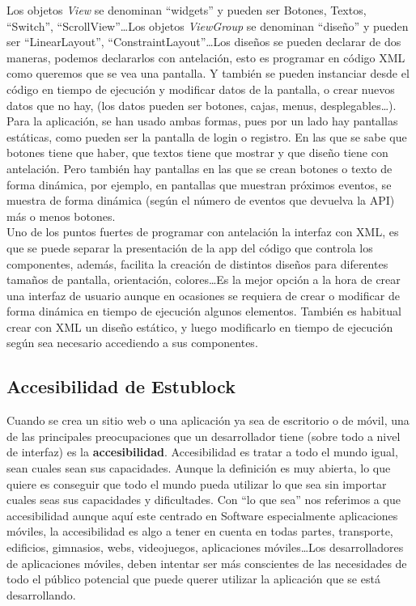 Los objetos \emph{View} se denominan ``widgets'' y pueden ser Botones, Textos, ``Switch'', ``ScrollView''\dots Los objetos \emph{ViewGroup} se denominan ``diseño'' y pueden ser ``LinearLayout'', ``ConstraintLayout''\dots Los diseños se pueden declarar de dos maneras, podemos declararlos con antelación, esto es programar en código XML como queremos que se vea una pantalla. Y también se pueden instanciar desde el código en tiempo de ejecución y modificar datos de la pantalla, o crear nuevos datos que no hay, (los datos pueden ser botones, cajas, menus, desplegables\dots). \\

Para la aplicación, se han usado ambas formas, pues por un lado hay pantallas estáticas, como pueden ser la pantalla de login o registro. En las que se sabe que botones tiene que haber, que textos tiene que mostrar y que diseño tiene con antelación. Pero también hay pantallas en las que se crean botones o texto de forma dinámica, por ejemplo, en pantallas que muestran próximos eventos, se muestra de forma dinámica (según el número de eventos que devuelva la API) más o menos botones. \\

Uno de los puntos fuertes de programar con antelación la interfaz con XML, es que se puede separar la presentación de la app del código que controla los componentes, además, facilita la creación de distintos diseños para diferentes tamaños de pantalla, orientación, colores\dots Es la mejor opción a la hora de crear una interfaz de usuario aunque en ocasiones se requiera de crear o modificar de forma dinámica en tiempo de ejecución algunos elementos. También es habitual crear con XML un diseño estático, y luego modificarlo en tiempo de ejecución según sea necesario accediendo a sus componentes.  


\subsection{Accesibilidad de Estublock}

Cuando se crea un sitio web o una aplicación ya sea de escritorio o de móvil, una de las principales preocupaciones que un desarrollador tiene (sobre todo a nivel de interfaz) es la \textbf{accesibilidad}. Accesibilidad es tratar a todo el mundo igual, sean cuales sean sus capacidades. Aunque la definición es muy abierta, lo que quiere es conseguir que todo el mundo pueda utilizar lo que sea sin importar cuales seas sus capacidades y dificultades. Con ``lo que sea'' nos referimos a que accesibilidad aunque aquí este centrado en Software especialmente aplicaciones móviles, la accesibilidad es algo a tener en cuenta en todas partes, transporte, edificios, gimnasios, webs, videojuegos, aplicaciones móviles\dots Los desarrolladores de aplicaciones móviles, deben intentar ser más conscientes de las necesidades de todo el público potencial que puede querer utilizar la aplicación que se está desarrollando. \\

